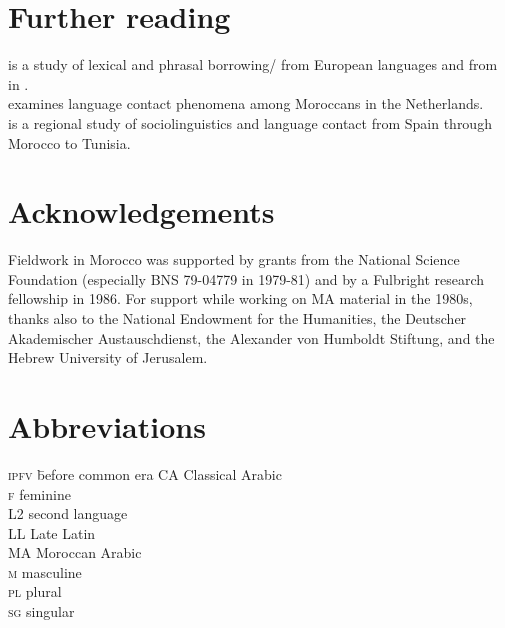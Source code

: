 \documentclass[output=paper]{langsci/langscibook}
\begin{document}
\section*{Further reading}

\citet{Heath1989} is a study of lexical and phrasal borrowing/ from European languages and from   in .\\
\citet{Nortier1990} examines language contact phenomena among Moroccans in the Netherlands.\\
\citet{Sayahi2014} is a regional study of  sociolinguistics and language contact from Spain through Morocco to Tunisia.

\section*{Acknowledgements}

Fieldwork in Morocco was supported by grants from the National Science Foundation (especially BNS 79-04779 in 1979-81) and by a Fulbright research fellowship in 1986. For support while working on MA material in the 1980s, thanks also to the National Endowment for the Humanities, the Deutscher Akademischer Austauschdienst, the Alexander von Humboldt Stiftung, and the {Hebrew} University of {Jerusalem}.


\section*{Abbreviations}
\begin{multicols}{2}
\begin{tabbing}
\textsc{ipfv} \hspace{1em} \= before common era\kill
CA         \> Classical Arabic\\
\textsc{f}  \> feminine\\
L2          \> second language \\
{LL}          \> Late Latin\\
MA         \> Moroccan Arabic\\
\textsc{m}  \> masculine\\
\textsc{pl} \> plural\\
\textsc{sg} \> singular
\end{tabbing}
\end{multicols}


{\sloppy\printbibliography[heading=subbibliography,notkeyword=this]}
\end{document}
